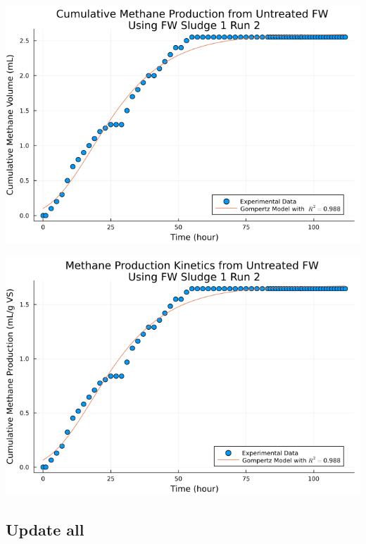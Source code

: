 \documentclass[11pt]{article}
\begin{document}
\begin{center}
\includegraphics[width=.9\linewidth]{../plots/BMPs/Untreated FW/methane_kinetics_untreated_fw_s1_r2_hour.png}
\end{center}

\begin{center}
\includegraphics[width=.9\linewidth]{../plots/BMPs/Untreated FW/specific_methane_kinetics_untreated_fw_s1_r2_hour.png}
\end{center}

\subsection{Update all}
\label{sec:org837eb52}
\end{document}
